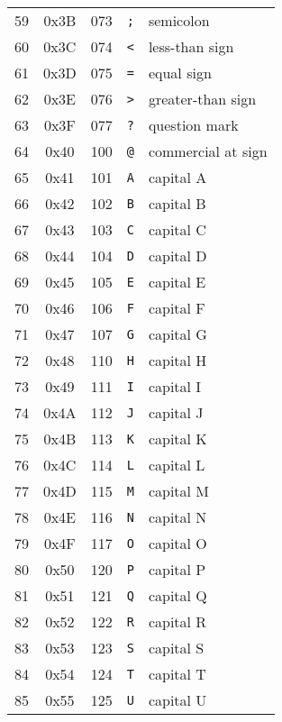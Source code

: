 \begin{supertabular}{r|c|c|c|p{.3\linewidth}}
59 & 0x3B & 073 & \verb|;| & semicolon\\
60 & 0x3C & 074 & \verb|<| & less-than sign\\
61 & 0x3D & 075 & \verb|=| & equal sign\\
62 & 0x3E & 076 & \verb|>| & greater-than sign\\
63 & 0x3F & 077 & \verb|?| & question mark\\
64 & 0x40 & 100 & \verb|@| & commercial at sign\\
65 & 0x41 & 101 & \verb|A| & capital A                    \\
66 & 0x42 & 102 & \verb|B| & capital B                    \\
67 & 0x43 & 103 & \verb|C| & capital C                    \\
68 & 0x44 & 104 & \verb|D| & capital D                    \\
69 & 0x45 & 105 & \verb|E| & capital E                    \\
70 & 0x46 & 106 & \verb|F| & capital F                    \\
71 & 0x47 & 107 & \verb|G| & capital G                    \\
72 & 0x48 & 110 & \verb|H| & capital H                    \\
73 & 0x49 & 111 & \verb|I| & capital I                    \\
74 & 0x4A & 112 & \verb|J| & capital J                    \\
75 & 0x4B & 113 & \verb|K| & capital K                    \\
76 & 0x4C & 114 & \verb|L| & capital L                    \\
77 & 0x4D & 115 & \verb|M| & capital M                    \\
78 & 0x4E & 116 & \verb|N| & capital N                    \\
79 & 0x4F & 117 & \verb|O| & capital O                    \\
80 & 0x50 & 120 & \verb|P| & capital P                    \\
81 & 0x51 & 121 & \verb|Q| & capital Q                    \\
82 & 0x52 & 122 & \verb|R| & capital R                    \\
83 & 0x53 & 123 & \verb|S| & capital S                    \\
84 & 0x54 & 124 & \verb|T| & capital T                    \\
85 & 0x55 & 125 & \verb|U| & capital U                    \\

\end{supertabular}
